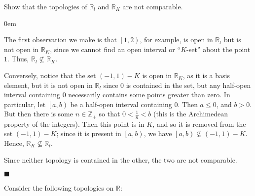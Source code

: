 \documentclass[12pt]{article}
\renewcommand{\qed}{\hfill$\blacksquare$}
\renewenvironment{proof}{\begin{addmargin}[1em]{0em}\begin{newproof}}{\end{newproof}\end{addmargin}\qed}
\newenvironment{problem}[2][Exercise]{\begin{trivlist}
\item[\hskip \labelsep {\bfseries #1}\hskip \labelsep {\bfseries #2.}]}{\end{trivlist}}
\begin{document}
\begin{problem}{13.6}
Show that the topologies of $\mathbb{R}_l$ and $\mathbb{R}_K$ are not comparable.
\end{problem}
\begin{proof}
The first observation we make is that $\left[1,2\right)$, for example, is open in $\mathbb{R}_l$ but is not open in $\mathbb{R}_K$, since we cannot find an open interval or ``$K$-set'' about the point $1$. Thus,  $\mathbb{R}_l\not\subseteq \mathbb{R}_K$.

Conversely, notice that the set $\left(-1,1\right)-K$ is open in $\mathbb{R}_K$, as it is a basis element, but it is not open in $\mathbb{R}_l$ since $0$ is contained in the set, but any half-open interval containing $0$ necessarily contains some points greater than zero. In particular, let $\left[a,b\right)$ be a half-open interval containing $0$. Then $a\leq 0$, and $b>0$. But then there is some $n\in \mathbb{Z}_+$ so that $0<\frac{1}{n} < b$ (this is the Archimedean property of the integers). Then this point is in $K$, and so it is removed from the set $\left(-1,1\right)-K$; since it is present in $\left[a,b\right)$, we have $\left[a,b\right) \not\subseteq \left(-1,1\right)-K$. Hence, $\mathbb{R}_K \not\subseteq \mathbb{R}_l$.

Since neither topology is contained in the other, the two are not comparable.   
\end{proof}


\begin{problem}{13.7}
	Consider the following topologies on $\mathbb{R}$:

\end{problem}
\end{document}
